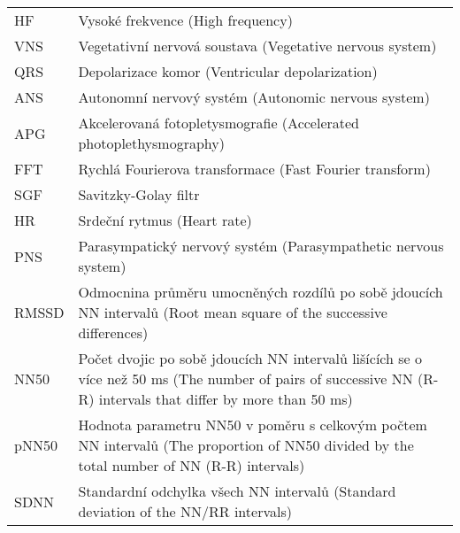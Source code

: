 \begin{table}[h]
\begin{center}
\begin{tabular}{p{2.5cm}p{12.25cm}}
			HF      & Vysoké frekvence (High frequency)                                                                                                                             \\
			VNS     & Vegetativní nervová soustava (Vegetative nervous system)                                                                                                      \\
			QRS     & Depolarizace komor (Ventricular depolarization)                                                                                                               \\
			ANS     & Autonomní nervový systém (Autonomic nervous system)                                                                                                           \\
			APG     & Akcelerovaná fotopletysmografie (Accelerated photoplethysmography)                                                                                            \\
			FFT     & Rychlá Fourierova transformace (Fast Fourier transform)                                                                                                       \\
			SGF     & Savitzky-Golay filtr                                                                                                                                          \\
			HR      & Srdeční rytmus (Heart rate)                                                                                                                                   \\
			PNS     & Parasympatický nervový systém (Parasympathetic nervous system)                                                                                                \\
			RMSSD   & Odmocnina průměru umocněných rozdílů po sobě jdoucích NN intervalů (Root mean square of the successive differences)                                           \\
			NN50    & Počet dvojic po sobě jdoucích NN intervalů lišících se o více než 50 ms (The number of pairs of successive NN (R-R) intervals that differ by more than 50 ms) \\
			pNN50   & Hodnota parametru NN50 v poměru s celkovým počtem NN intervalů (The proportion of NN50 divided by the total number of NN (R-R) intervals)                     \\
			SDNN    & Standardní odchylka všech NN intervalů (Standard deviation of the NN/RR intervals)                                                                            \\

\end{tabular}
\end{center}
\end{table}
